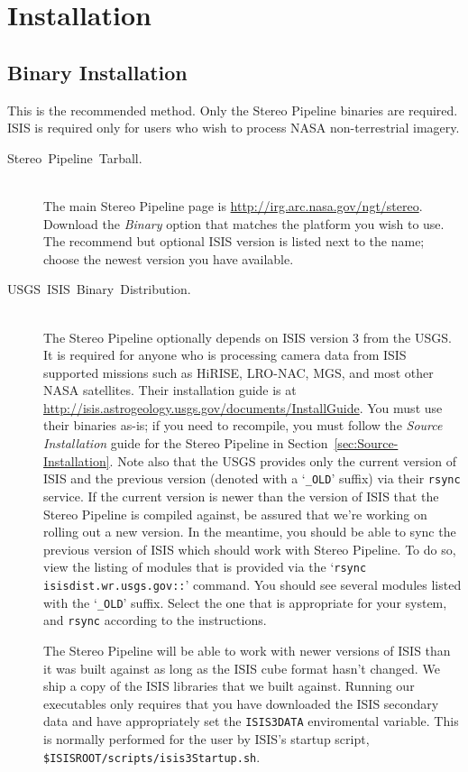 \chapter{Installation}

\section{Binary Installation}

This is the recommended method. Only the Stereo Pipeline binaries are
required. ISIS is required only for users who wish to process
NASA non-terrestrial imagery.

\begin{description}
\item [{Stereo~Pipeline~Tarball.}] \hspace*{\fill} \\

The main Stereo Pipeline page is
\url{http://irg.arc.nasa.gov/ngt/stereo}.  Download the \emph{Binary}
option that matches the platform you wish to use. The recommend but
optional \ac{ISIS} version is listed next to the name; choose the
newest version you have available.

\item [{USGS~ISIS~Binary~Distribution.}] \hspace*{\fill} \\

The Stereo Pipeline optionally depends on \ac{ISIS} version 3 from the
\ac{USGS}\@. It is required for anyone who is processing camera data
from ISIS supported missions such as HiRISE, LRO-NAC, MGS, and most
other NASA satellites. Their installation guide is at
\url{http://isis.astrogeology.usgs.gov/documents/InstallGuide}. You
must use their binaries as-is; if you need to recompile, you must
follow the \emph{Source Installation} guide for the Stereo Pipeline in
Section~\ref{sec:Source-Installation}.  Note also that the \ac{USGS}
provides only the current version of \ac{ISIS} and the previous
version (denoted with a `\texttt{\_OLD}' suffix) via their
\texttt{rsync} service.  If the current version is newer than the
version of ISIS that the Stereo Pipeline is compiled against, be
assured that we're working on rolling out a new version.  In the
meantime, you should be able to sync the previous version of ISIS
which should work with Stereo Pipeline.  To do so, view the listing of
modules that is provided via the `\texttt{rsync
  isisdist.wr.usgs.gov::}' command.  You should see several modules
listed with the `\texttt{\_OLD}' suffix.  Select the one that is
appropriate for your system, and \texttt{rsync} according to the
instructions.

The Stereo Pipeline will be able to work with newer versions of ISIS
than it was built against as long as the ISIS cube format hasn't
changed. We ship a copy of the ISIS libraries that we built
against. Running our executables only requires that you have
downloaded the ISIS secondary data and have appropriately set the
\texttt{ISIS3DATA} enviromental variable. This is normally performed
for the user by ISIS's startup script,
\texttt{\$ISISROOT/scripts/isis3Startup.sh}.

\end{description}

